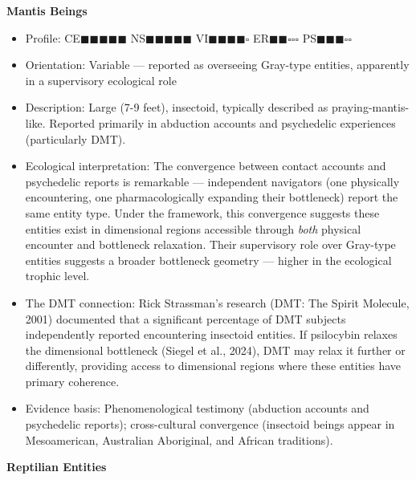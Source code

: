 \textbf{Mantis Beings}

\begin{itemize}[nosep,leftmargin=*]
  \item Profile: CE$\blacksquare$$\blacksquare$$\blacksquare$$\blacksquare$$\blacksquare$ NS$\blacksquare$$\blacksquare$$\blacksquare$$\blacksquare$$\blacksquare$ VI$\blacksquare$$\blacksquare$$\blacksquare$$\blacksquare$$\square$ ER$\blacksquare$$\blacksquare$$\square$$\square$$\square$ PS$\blacksquare$$\blacksquare$$\blacksquare$$\square$$\square$
  \item Orientation: Variable — reported as overseeing Gray-type entities, apparently in a supervisory ecological role
  \item Description: Large (7-9 feet), insectoid, typically described as praying-mantis-like. Reported primarily in abduction accounts and psychedelic experiences (particularly DMT).
  \item Ecological interpretation: The convergence between contact accounts and psychedelic reports is remarkable — independent navigators (one physically encountering, one pharmacologically expanding their bottleneck) report the same entity type. Under the framework, this convergence suggests these entities exist in dimensional regions accessible through \textit{both} physical encounter and bottleneck relaxation. Their supervisory role over Gray-type entities suggests a broader bottleneck geometry — higher in the ecological trophic level.
  \item The DMT connection: Rick Strassman's research (DMT: The Spirit Molecule, 2001) documented that a significant percentage of DMT subjects independently reported encountering insectoid entities. If psilocybin relaxes the dimensional bottleneck (Siegel et al., 2024), DMT may relax it further or differently, providing access to dimensional regions where these entities have primary coherence.
  \item Evidence basis: Phenomenological testimony (abduction accounts and psychedelic reports); cross-cultural convergence (insectoid beings appear in Mesoamerican, Australian Aboriginal, and African traditions).
\end{itemize}


\textbf{Reptilian Entities}

